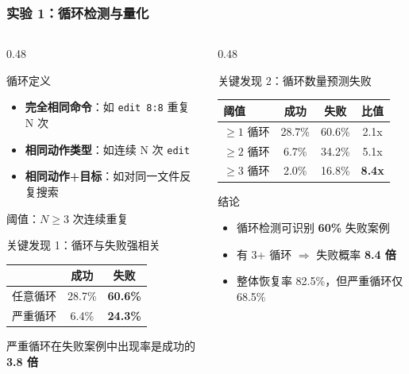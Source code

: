 \documentclass[aspectratio=169,10pt]{beamer}
\renewcommand{\footnotesize}{\tiny}
\begin{document}
\begin{frame}
  \frametitle{实验 1：循环检测与量化}

  \begin{columns}[T]
    \begin{column}{0.48\textwidth}
      \begin{block}{循环定义}
        \begin{itemize}
          \item \textbf{完全相同命令}：如 \texttt{edit 8:8} 重复 N 次
          \item \textbf{相同动作类型}：如连续 N 次 \texttt{edit}
          \item \textbf{相同动作+目标}：如对同一文件反复搜索
        \end{itemize}
        阈值：$N \geq 3$ 次连续重复
      \end{block}

      \begin{block}{关键发现 1：循环与失败强相关}
        \footnotesize
        \begin{tabular}{l|c|c}
          & \textbf{成功} & \textbf{失败} \\
          \hline
          任意循环 & 28.7\% & \textbf{60.6\%} \\
          严重循环 & 6.4\% & \textbf{24.3\%} \\
        \end{tabular}

        \vspace{0.2cm}
        严重循环在失败案例中出现率是成功的 \textbf{3.8 倍}
      \end{block}
    \end{column}

    \begin{column}{0.48\textwidth}
      \begin{block}{关键发现 2：循环数量预测失败}
        \footnotesize
        \begin{tabular}{l|c|c|c}
          \textbf{阈值} & \textbf{成功} & \textbf{失败} & \textbf{比值} \\
          \hline
          $\geq 1$ 循环 & 28.7\% & 60.6\% & 2.1x \\
          $\geq 2$ 循环 & 6.7\% & 34.2\% & 5.1x \\
          $\geq 3$ 循环 & 2.0\% & 16.8\% & \textbf{8.4x} \\
        \end{tabular}
      \end{block}

      \begin{alertblock}{结论}
        \begin{itemize}
          \item 循环检测可识别 \textbf{60\%} 失败案例
          \item 有 3+ 循环 $\Rightarrow$ 失败概率 \textbf{8.4 倍}
          \item 整体恢复率 82.5\%，但严重循环仅 68.5\%
        \end{itemize}
      \end{alertblock}
    \end{column}
  \end{columns}
\end{frame}
\end{document}
